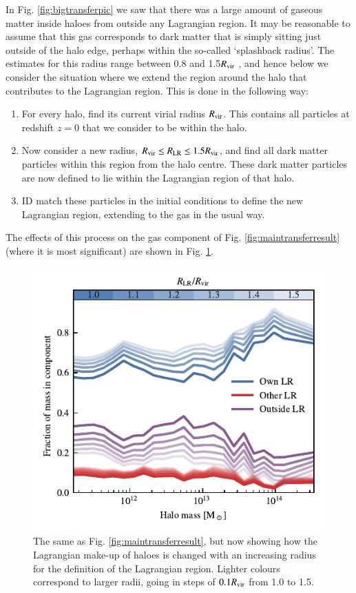 In Fig. \ref{fig:bigtransferpic} we saw that there was a large amount of
gaseous matter inside haloes from outside any Lagrangian region. It may be
reasonable to assume that this gas corresponds to dark matter that is simply
sitting just outside of the halo edge, perhaps within the so-called
`splashback radius'. The estimates for this radius range between 0.8 and
1.5$R_{\rm vir}$ \citep{More2015, Diemer2017a}, and hence below we consider
the situation where we extend the region around the halo that contributes to
the Lagrangian region. This is done in the following way:
\begin{enumerate}
	\item For every halo, find its current virial radius $R_{\rm vir}$. This contains
	      all particles at redshift $z=0$ that we consider to be within the halo.
    \item Now consider a new radius, $R_{\rm vir} \leq R_{\rm LR} \leq 1.5
		R_{\rm vir}$, and find all dark matter particles within this region
		from the halo centre. These dark matter particles are now defined to
		lie within the Lagrangian region of that halo.
    \item ID match these particles in the initial conditions to define the new
        Lagrangian region, extending to the gas in the usual way.
\end{enumerate}
The
effects of this process on the gas component of Fig.
\ref{fig:maintransferresult} (where it is most significant) are shown in Fig.
\ref{fig:radius_dependence}.


\begin{figure}
    \centering
    \includegraphics{figures/radius_convergence.pdf}
    \vspace{-0.7cm}
    \caption{The same as Fig. \ref{fig:maintransferresult}, but now showing
    how the Lagrangian make-up of haloes is changed with an increasing radius
    for the definition of the Lagrangian region. Lighter colours correspond
    to larger radii, going in steps of $0.1R_{\rm vir}$ from 1.0 to 1.5.}
    \label{fig:radius_dependence}
\end{figure}

